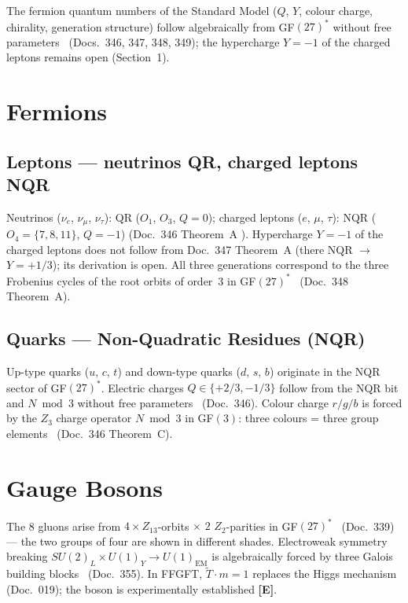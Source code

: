 The fermion quantum numbers of the Standard Model
($Q$, $Y$, colour charge, chirality, generation structure) follow
algebraically from GF$(27)^*$ without free parameters \BM\
(Docs.~346, 347, 348, 349); the hypercharge $Y = -1$ of the charged
leptons remains open (Section~1).

\section{Fermions}

\subsection*{Leptons --- neutrinos QR, charged leptons NQR}

Neutrinos ($\nu_e$, $\nu_\mu$, $\nu_\tau$): QR ($O_1$, $O_3$, $Q = 0$);
charged leptons ($e$, $\mu$, $\tau$): NQR ($O_4 = \{7,8,11\}$, $Q = -1$)
(Doc.~346 Theorem~A \BM).
Hypercharge $Y = -1$ of the charged leptons does not follow from
Doc.~347 Theorem~A (there NQR $\to$ $Y = +1/3$); its derivation is open.
All three generations correspond to the three Frobenius cycles of the
root orbits of order~3 in GF$(27)^*$ \BM\ (Doc.~348 Theorem~A).

\subsection*{Quarks --- Non-Quadratic Residues (NQR)}

Up-type quarks ($u$, $c$, $t$) and down-type quarks ($d$, $s$, $b$)
originate in the NQR sector of GF$(27)^*$.
Electric charges $Q \in \{+2/3, -1/3\}$ follow from the NQR bit
and $N \bmod 3$ without free parameters \BM\ (Doc.~346).
Colour charge $r/g/b$ is forced by the $Z_3$ charge operator
$N \bmod 3$ in GF$(3)$: three colours = three group elements \BM\
(Doc.~346 Theorem~C).

\section{Gauge Bosons}

The 8 gluons arise from $4 \times Z_{13}$-orbits $\times$ $2$
$Z_2$-parities in GF$(27)^*$ \BM\ (Doc.~339) --- the two groups of
four are shown in different shades.
Electroweak symmetry breaking
$SU(2)_L \times U(1)_Y \to U(1)_\text{EM}$ is algebraically forced
by three Galois building blocks \BM\ (Doc.~355).
In FFGFT, $\tilde{T} \cdot m = 1$ replaces the Higgs mechanism
(Doc.~019); the boson is experimentally established \textbf{[E]}.

